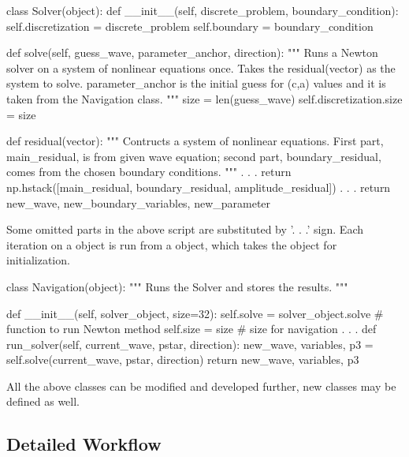 \begin{python}
class Solver(object):
    def __init__(self, discrete_problem, boundary_condition):
        self.discretization = discrete_problem
        self.boundary = boundary_condition

    def solve(self, guess_wave, parameter_anchor, direction):
    """ Runs a Newton solver on a system of nonlinear equations once. 
    Takes the residual(vector) as the system to solve. parameter_anchor 
    is the initial guess for (c,a) values and it is taken from the 
    Navigation class. """
        size = len(guess_wave)
        self.discretization.size = size

        def residual(vector):
        """ Contructs a system of nonlinear equations. First part, 
        main_residual, is from given wave equation; second part, 
        boundary_residual, comes from the chosen boundary conditions. """
        . . .   
        return np.hstack([main_residual, boundary_residual, 
                                          amplitude_residual])  
    . . .
    return new_wave, new_boundary_variables, new_parameter
\end{python}
%
Some omitted parts in the above script are substituted by \textsf{'. . .'} sign. Each iteration on a  object is run from a  object, which takes the  object for initialization. 
\begin{python}
class Navigation(object):
""" Runs the Solver and stores the results. """

    def __init__(self, solver_object, size=32):
    self.solve = solver_object.solve # function to run Newton method
    self.size = size # size for navigation
    . . . 
    def run_solver(self, current_wave, pstar, direction):
        new_wave, variables, p3 = self.solve(current_wave, pstar, direction)
        return new_wave, variables, p3
\end{python}


All the above classes can be modified and developed further, new classes may be defined as well.

\subsection{Detailed Workflow}

